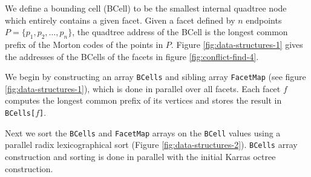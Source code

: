 \documentclass[submission]{gmp2017}
\begin{document}
We define a bounding cell (BCell) to be the smallest internal quadtree node which entirely contains a given facet. Given a facet defined by $n$ endpoints $P=\{p_1, p_2, \dots, p_n\}$, the quadtree address of the BCell is the longest common prefix of the Morton codes of the points in $P$. Figure \ref{fig:data-structures-1} gives the addresses of the BCells of the facets in figure \ref{fig:conflict-find-4}.

We begin by constructing an array \texttt{BCells} and sibling array \texttt{FacetMap} (see figure \ref{fig:data-structures-1}), which is done in parallel over all facets. Each facet $f$ computes the longest common prefix of its vertices and stores the result in \texttt{BCells[$f$]}.

Next we sort the \texttt{BCells} and \texttt{FacetMap} arrays on the \texttt{BCell} values using a parallel radix lexicographical sort (Figure \ref{fig:data-structures-2}). \texttt{BCells} array construction and sorting is done in parallel with the initial Karras octree construction.
\end{document}
